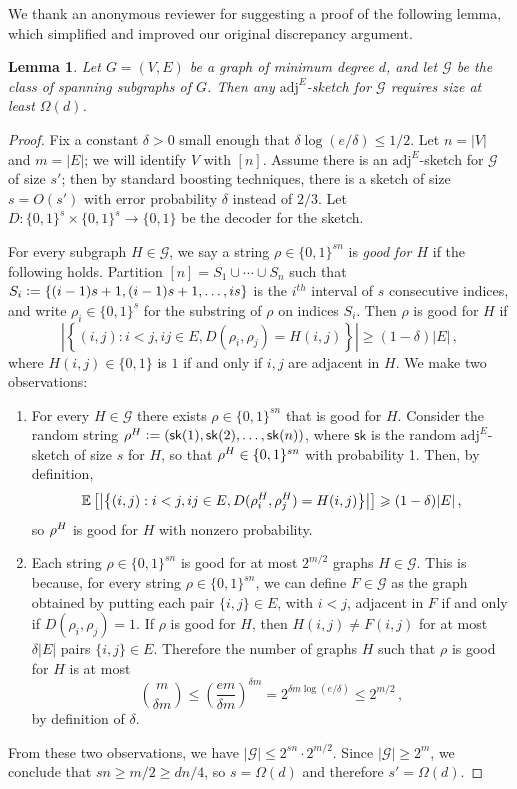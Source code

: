 \documentclass[11pt]{article}
\newtheorem{lemma}[thm]{Lemma}
\theoremstyle{definition}
\newcommand{\zo}{\{0,1\}}
\newcommand{\define}{\vcentcolon=}
\newcommand{\G}{\mathcal{G}}
\newcommand{\sk}{\mathsf{sk}}
\renewcommand{\leq}{\leqslant}
\renewcommand{\geq}{\geqslant}
\def\G {{\mathcal G}}
\def\sk {\mathsf{sk}}
\begin{document}
We thank an anonymous reviewer for suggesting a proof of the following lemma, which simplified and
improved our original discrepancy argument.

\smallskip

\begin{lemma}\label{lemma:min degree}
Let $G = (V,E)$ be a graph of minimum degree $d$, and let $\G$ be the class of spanning subgraphs of
$G$. Then any $\mathrm{adj}^E$-sketch for $\G$ requires size at least $\Omega(d)$.
\end{lemma}
\begin{proof}
Fix a constant $\delta > 0$ small enough that $\delta\log(e/\delta) \leq 1/2$.  Let $n = |V|$ and
$m=|E|$; we will identify $V$ with $[n]$.  Assume there is an
$\mathrm{adj}^E$-sketch  for $\G$ of size
$s'$; then by standard boosting techniques, there is a sketch of size $s = O(s')$ with error
probability $\delta$ instead of $2/3$. Let $D : \zo^s \times \zo^s \to \zo$ be the decoder for the
sketch.

For every subgraph $H \in \G$, we say a string $\rho \in \zo^{sn}$ is \emph{good for $H$} if the
following holds. Partition $[n] = S_1 \cup \dotsm \cup S_n$ such that $S_i \define \{ (i-1)s+1,
(i-1)s+1, \dotsc, is\}$ is the $i^{th}$ interval of $s$ consecutive indices, and write $\rho_i \in
\zo^s$ for the substring of $\rho$ on indices $S_i$. Then $\rho$ is good for $H$ if
\[
  \left|\left\{ (i,j) : i < j, ij \in E,  D(\rho_i, \rho_j) = H(i,j) \right\}\right|\geq (1-\delta) |E| \,,
\]
where $H(i,j) \in \zo$ is $1$ if and only if $i,j$ are adjacent in $H$. We make two observations:
\begin{enumerate}
\item For every $H \in \G$ there exists $\rho \in \zo^{sn}$ that is good for $H$. Consider the
random string ${\bf \rho}^H \define (\sk(1), \sk(2), \dotsc, \sk(n))$, where $\sk$ is the random
$\mathrm{adj}^E$-sketch of size $s$ for $H$, so that ${\bf \rho}^H \in \zo^{sn}$ with probability 1. Then,
by definition,
\[
  \mathbb{E}\left[ \left|\left\{ (i,j) : i < j, ij\in E,  D({\bf \rho}^H_i, {\bf \rho}^H_j)
      = H(i,j) \right\}\right| \right]
  \geq (1-\delta) |E| \,,
\]
so ${\bf \rho}^H$ is good for $H$ with nonzero probability.  \item Each string $\rho \in \zo^{sn}$
is good for at most $2^{m/2}$ graphs $H \in \G$. This is because, for every string $\rho \in
\zo^{sn}$, we can define $F \in \G$ as the graph obtained by putting each pair $\{i,j\} \in E$, with
$i < j$, adjacent in $F$ if and only if $D(\rho_i, \rho_j) = 1$. If $\rho$ is good for $H$, then
$H(i,j) \neq F(i,j)$ for at most $\delta |E|$ pairs $\{i,j\} \in E$.  Therefore the number of graphs
$H$ such that $\rho$ is good for $H$ is at most
\[
  {m \choose \delta m} \leq
\left(\frac{em}{\delta m}\right)^{\delta m} = 2^{\delta m \log(e/\delta)} \leq 2^{m/2} \,,
\]
by definition of $\delta$.
\end{enumerate}
From these two observations, we have $|\G| \leq 2^{sn} \cdot 2^{m/2}$. Since $|\G| \geq 2^m$, we
conclude that $sn \geq m/2 \geq dn/4$, so $s = \Omega(d)$ and therefore $s' = \Omega(d)$.
\end{proof}
\end{document}
